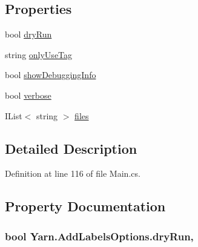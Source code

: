 \subsection*{Properties}
\begin{DoxyCompactItemize}
\item 
bool \hyperlink{a00031_a5dc9d9db767738237e988f95fc0330f4}{dry\-Run}
\item 
string \hyperlink{a00031_ab6162338f9606a836f3101fe0e228249}{only\-Use\-Tag}
\item 
bool \hyperlink{a00035_a89964ea17bd19caf00cb5bff563ed01c}{show\-Debugging\-Info}
\item 
bool \hyperlink{a00035_ada4d83d1756918f362d55f6649b82b17}{verbose}
\item 
I\-List$<$ string $>$ \hyperlink{a00035_aa93cbb1bc1d5328e0a417012621e92d2}{files}
\end{DoxyCompactItemize}


\subsection{Detailed Description}


Definition at line 116 of file Main.\-cs.



\subsection{Property Documentation}
\hypertarget{a00031_a5dc9d9db767738237e988f95fc0330f4}{
\subsubsection[{dry\-Run}]{\setlength{\rightskip}{0pt plus 5cm}bool Yarn.\-Add\-Labels\-Options.\-dry\-Run\hspace{0.3cm}{\ttfamily [get]}, {\ttfamily [set]}}}\label{a00031_a5dc9d9db767738237e988f95fc0330f4}


